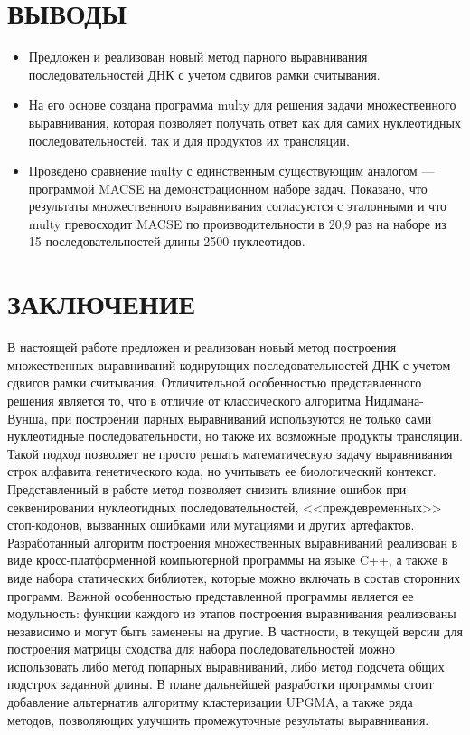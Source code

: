 \newpage
\part*{\large \centering ВЫВОДЫ}
\begin{itemize}
\item Предложен и реализован новый метод парного выравнивания последовательностей ДНК с учетом сдвигов рамки считывания.
\item На его основе создана программа multy для решения задачи множественного выравнивания, которая позволяет получать ответ как для самих нуклеотидных последовательностей, так и для продуктов их трансляции.
\item Проведено сравнение multy с единственным существующим аналогом --- программой MACSE на демонстрационном наборе задач. Показано, что результаты множественного выравнивания согласуются с эталонными и что multy превосходит MACSE по производительности в 20,9 раз на наборе из 15 последовательностей длины 2500 нуклеотидов.
\end{itemize}   

\newpage
\part*{\large \centering ЗАКЛЮЧЕНИЕ}
\hspace{\parindent}В настоящей работе предложен и реализован новый метод построения множественных выравниваний кодирующих последовательностей ДНК с учетом сдвигов рамки считывания. Отличительной особенностью представленного решения является то, что в отличие от классического алгоритма Нидлмана-Вунша, при построении парных выравниваний используются не только сами нуклеотидные последовательности, но также их возможные продукты трансляции. Такой подход позволяет не просто решать математическую задачу выравнивания строк алфавита генетического кода, но учитывать ее биологический контекст. Представленный в работе метод позволяет снизить влияние ошибок при секвенировании нуклеотидных последовательностей, <<преждевременных>> стоп-кодонов, вызванных ошибками или мутациями и других артефактов.\\
\indent Разработанный алгоритм построения множественных выравниваний реализован в виде кросс-платформенной компьютерной программы на языке C++, а также в виде набора статических библиотек, которые можно включать в состав сторонних программ. Важной особенностью представленной программы является ее модульность: функции каждого из этапов построения выравнивания реализованы независимо и могут быть заменены на другие. В частности, в текущей версии для построения матрицы сходства для набора последовательностей можно использовать либо метод попарных выравниваний, либо метод подсчета общих подстрок заданной длины. В плане дальнейшей разработки программы стоит добавление альтернатив алгоритму кластеризации UPGMA, а также ряда методов, позволяющих улучшить промежуточные результаты выравнивания.
